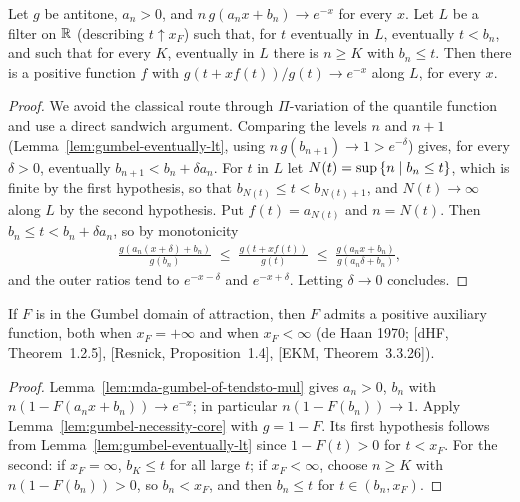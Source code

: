 \begin{lemma}
  \label{lem:gumbel-necessity-core}
  \leanok
  Let $g$ be antitone, $a_n > 0$, and $n \, g(a_n x + b_n) \to e^{-x}$ for every $x$. Let $L$ be a
  filter on $\mathbb{R}$ (describing $t \uparrow x_F$) such that, for $t$ eventually in $L$, eventually
  $t < b_n$, and such that for every $K$, eventually in $L$ there is $n \ge K$ with $b_n \le t$.
  Then there is a positive function $f$ with $g(t + x f(t))/g(t) \to e^{-x}$ along $L$, for
  every $x$.
\end{lemma}
\begin{proof}
  \leanok
  We avoid the classical route through $\Pi$-variation of the quantile function and use a direct
  sandwich argument. Comparing the levels $n$ and $n+1$ (Lemma~\ref{lem:gumbel-eventually-lt},
  using $n \, g(b_{n+1}) \to 1 > e^{-\delta}$) gives, for every $\delta > 0$, eventually
  $b_{n+1} < b_n + \delta a_n$. For $t$ in $L$ let $N(t) = \sup \left\{  n \; | \; b_n \le t  \right\}$,
  which is finite by the first hypothesis, so that $b_{N(t)} \le t < b_{N(t)+1}$, and
  $N(t) \to \infty$ along $L$ by the second hypothesis. Put $f(t) = a_{N(t)}$ and $n = N(t)$.
  Then $b_n \le t < b_n + \delta a_n$, so by monotonicity
  \begin{align*}
    \frac{g(a_n (x + \delta) + b_n)}{g(b_n)} \; \le \; \frac{g(t + x f(t))}{g(t)}
      \; \le \; \frac{g(a_n x + b_n)}{g(a_n \delta + b_n)} ,
  \end{align*}
  and the outer ratios tend to $e^{-x - \delta}$ and $e^{-x + \delta}$. Letting $\delta \to 0$
  concludes.
\end{proof}

\begin{theorem}
  \label{thm:gumbel-necessity}
  \leanok
  If $F$ is in the Gumbel domain of attraction, then $F$ admits a positive auxiliary function,
  both when $x_F = +\infty$ and when $x_F < \infty$ (de Haan 1970; [dHF, Theorem~1.2.5],
  [Resnick, Proposition~1.4], [EKM, Theorem~3.3.26]).
\end{theorem}
\begin{proof}
  \leanok
  Lemma~\ref{lem:mda-gumbel-of-tendsto-mul} gives $a_n > 0$, $b_n$ with
  $n (1 - F(a_n x + b_n)) \to e^{-x}$; in particular $n (1 - F(b_n)) \to 1$. Apply
  Lemma~\ref{lem:gumbel-necessity-core} with $g = 1 - F$. Its first hypothesis follows from
  Lemma~\ref{lem:gumbel-eventually-lt} since $1 - F(t) > 0$ for $t < x_F$. For the second: if
  $x_F = \infty$, $b_K \le t$ for all large $t$; if $x_F < \infty$, choose $n \ge K$ with
  $n (1 - F(b_n)) > 0$, so $b_n < x_F$, and then $b_n \le t$ for $t \in (b_n, x_F)$.
\end{proof}

